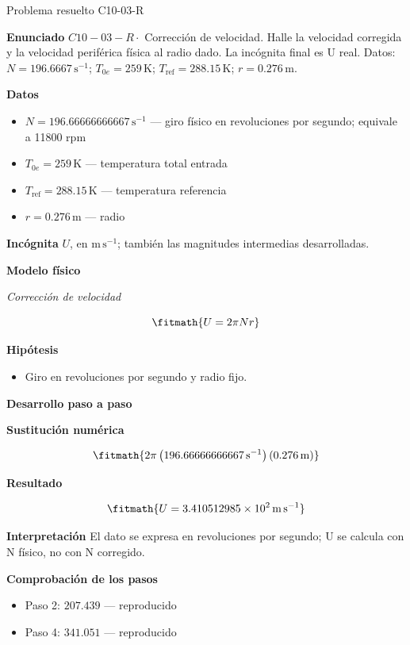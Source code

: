 \documentclass[10pt,openany]{book}
\begin{document}
\begin{studiumworked}{Problema resuelto C10-03-R}


\noindent\textbf{Enunciado}
\(C10-03-R \cdot\) Corrección de velocidad. Halle la velocidad corregida y la velocidad periférica física al radio dado. La incógnita final es U real. Datos: \(N=196.6667\, \mathrm{s}^{-1}\); \(T_{0e}=259\, \mathrm{K}\); \(T_{\mathrm{ref}}=288.15\, \mathrm{K}\); \(r=0.276\, \mathrm{m}\).

\noindent\textbf{Datos}
\begin{itemize}
\item $N = 196.66666666667\,\mathrm{s}^{-1}$ — giro físico en revoluciones por segundo; equivale a 11800 rpm
\item $T_{0e} = 259\,\mathrm{K}$ — temperatura total entrada
\item $T_{\mathrm{ref}} = 288.15\,\mathrm{K}$ — temperatura referencia
\item $r = 0.276\,\mathrm{m}$ — radio
\end{itemize}

\noindent\textbf{Incógnita}
$U$, en $\mathrm{m\,s^{-1}}$; también las magnitudes intermedias desarrolladas.

\noindent\textbf{Modelo físico}

\noindent\textit{Corrección de velocidad}

\[
\fitmath{U=2 \pi N r}
\]

\noindent\textbf{Hipótesis}
\begin{itemize}
\item Giro en revoluciones por segundo y radio fijo.
\end{itemize}

\noindent\textbf{Desarrollo paso a paso}



\noindent\textbf{Sustitución numérica}

\[
\fitmath{2 \pi \left(196.66666666667\,\mathrm{s}^{-1}\right) \left(0.276\,\mathrm{m}\right)}
\]

\noindent\textbf{Resultado}

\[
\fitmath{U=3.410512985\times10^{2}\,\mathrm{m}\,\mathrm{s}^{-1}}
\]

\noindent\textbf{Interpretación}
El dato se expresa en revoluciones por segundo; U se calcula con N físico, no con N corregido.

\noindent\textbf{Comprobación de los pasos}
\begin{itemize}
\item Paso 2: $207.439$ — reproducido
\item Paso 4: $341.051$ — reproducido
\end{itemize}


\end{studiumworked}
\end{document}
